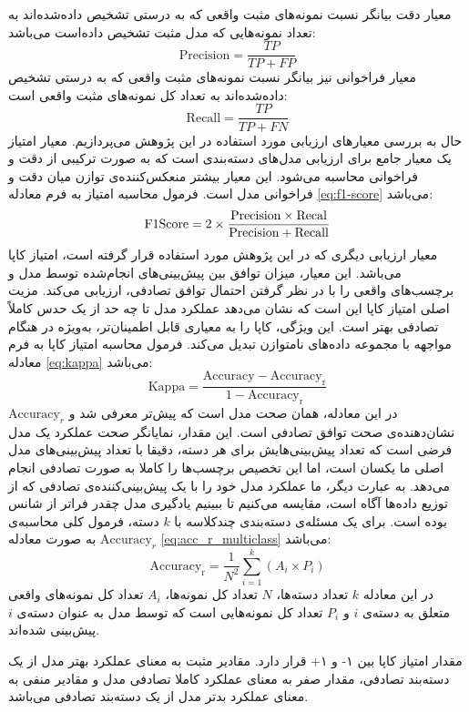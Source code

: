 معیار دقت بیانگر نسبت نمونه‌های مثبت واقعی که به درستی تشخیص داده‌شده‌اند به تعداد نمونه‌هایی که مدل مثبت تشخیص داده‌است می‌باشد:
\begin{equation}
    \mathrm{Precision}=\frac{TP}{TP+FP}
\end{equation}
معیار فراخوانی نیز بیانگر نسبت نمونه‌های مثبت واقعی که به درستی تشخیص داده‌شده‌اند به تعداد کل نمونه‌های مثبت واقعی است:
\begin{equation}
    \mathrm{Recall}=\frac{TP}{TP+FN}
\end{equation}
حال به بررسی معیارهای ارزیابی مورد استفاده در این پژوهش می‌پردازیم. معیار امتیاز 
یک معیار جامع برای ارزیابی مدل‌های دسته‌بندی است که به صورت ترکیبی از دقت و فراخوانی محاسبه می‌شود. این معیار بیشتر منعکس‌کننده‌ی توازن میان دقت و فراخوانی مدل است. فرمول محاسبه امتیاز  به فرم معادله \ref{eq:f1-score} می‌باشد:
\begin{equation}
    \mathrm{F1 \space Score}=2\times\frac{\mathrm{Precision}\times\mathrm{Recal}}{\mathrm{Precision}+\mathrm{Recall}}
    \label{eq:f1-score}
\end{equation}
معیار ارزیابی دیگری که در این پژوهش مورد استفاده قرار گرفته است، امتیاز کاپا می‌باشد. این معیار، میزان توافق بین پیش‌بینی‌های انجام‌شده توسط مدل و برچسب‌های واقعی را با در نظر گرفتن احتمال توافق تصادفی، ارزیابی می‌کند. مزیت اصلی امتیاز کاپا این است که نشان می‌دهد عملکرد مدل تا چه حد از یک حدس کاملاً تصادفی بهتر است. این ویژگی، کاپا را به معیاری قابل اطمینان‌تر، به‌ویژه در هنگام مواجهه با مجموعه داده‌های نامتوازن تبدیل می‌کند. فرمول محاسبه امتیاز کاپا به فرم معادله \ref{eq:kappa} می‌باشد:
\begin{equation}
\mathrm{Kappa} = \frac{\mathrm{Accuracy} - \mathrm{Accuracy_r}}{1 - \mathrm{Accuracy_r}}
\label{eq:kappa}
\end{equation}
در این معادله،
همان صحت مدل است که پیش‌تر معرفی شد و $\mathrm{Accuracy}_r$
نشان‌دهنده‌ی صحت توافق تصادفی است. این مقدار، نمایانگر صحت عملکرد یک مدل فرضی است که تعداد پیش‌بینی‌هایش برای هر دسته، دقیقا با تعداد پیش‌بینی‌های مدل اصلی ما یکسان است، اما این تخصیص برچسب‌ها را کاملا 
به صورت تصادفی انجام می‌دهد. به عبارت دیگر، ما عملکرد مدل خود را با یک پیش‌بینی‌کننده‌ی تصادفی که از توزیع داده‌ها آگاه است، مقایسه می‌کنیم تا ببینیم یادگیری مدل چقدر فراتر از شانس بوده است. برای یک مسئله‌ی دسته‌بندی چندکلاسه با $k$
دسته، فرمول کلی محاسبه‌ی $\mathrm{Accuracy}_r$
به صورت معادله \ref{eq:acc_r_multiclass} می‌باشد:
\begin{equation}
\mathrm{Accuracy_r} = \frac{1}{N^2} \sum_{i=1}^{k} (A_i \times P_i)
\label{eq:acc_r_multiclass}
\end{equation}
در این معادله $k$ تعداد دسته‌ها، $N$ تعداد کل نمونه‌ها، $A_i$ تعداد کل نمونه‌های واقعی متعلق به دسته‌ی $i$ و $P_i$
تعداد کل نمونه‌هایی است که توسط مدل به عنوان دسته‌ی $i$ پیش‌بینی شده‌اند.

مقدار امتیاز کاپا بین ۱- و ۱+ قرار دارد. مقادیر مثبت به معنای عملکرد بهتر مدل از یک دسته‌بند تصادفی، مقدار صفر به معنای عملکرد کاملا تصادفی مدل و مقادیر منفی به معنای عملکرد بدتر مدل از یک دسته‌بند تصادفی می‌باشد.


